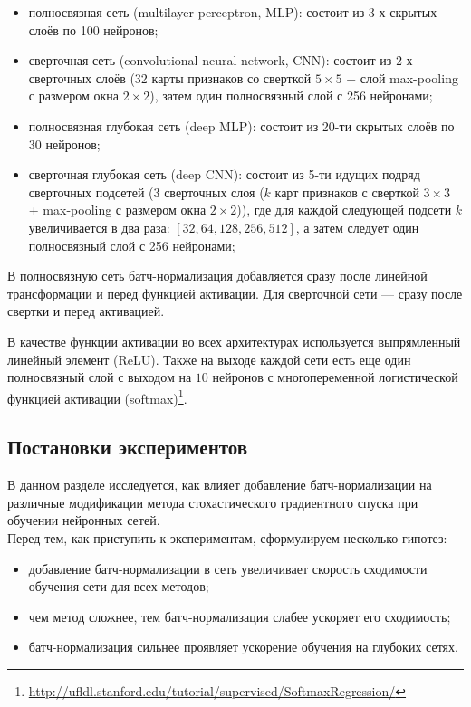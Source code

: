 \documentclass[12pt]{article}
\begin{document}
\begin{itemize}
\item полносвязная сеть (multilayer perceptron, MLP): состоит из 3-х скрытых слоёв по 100 нейронов;
\item сверточная сеть (convolutional neural network, CNN): состоит из 2-х сверточных слоёв (32 карты признаков со сверткой $5 \times 5$ + слой max-pooling с размером окна $2 \times 2$), затем один полносвязный слой с 256 нейронами;
\item полносвязная глубокая сеть (deep MLP): состоит из 20-ти скрытых слоёв по 30 нейронов;
\item сверточная глубокая сеть (deep CNN): состоит из 5-ти идущих подряд сверточных подсетей (3 сверточных слоя ($k$ карт признаков с сверткой $3 \times 3$ + max-pooling с размером окна $2 \times 2$)), где для каждой следующей подсети $k$ увеличивается в два раза: $[32, 64, 128, 256, 512]$, а затем следует один полносвязный слой с 256 нейронами;
\end{itemize}

В полносвязную сеть батч-нормализация добавляется сразу после линейной трансформации и перед функцией активации. Для сверточной сети --- сразу после свертки и перед активацией.

В качестве функции активации во всех архитектурах используется выпрямленный линейный элемент (ReLU). Также на выходе каждой сети есть еще один полносвязный слой с выходом на $10$ нейронов с многопеременной логистической функцией активации (softmax)\footnote{\url{http://ufldl.stanford.edu/tutorial/supervised/SoftmaxRegression/}}.


\subsection{Постановки экспериментов}

В данном разделе исследуется, как влияет добавление батч-нормализации на различные модификации метода стохастического градиентного спуска при обучении нейронных сетей.\\

Перед тем, как приступить к экспериментам, сформулируем несколько гипотез:
\begin{itemize}
\item добавление батч-нормализации в сеть увеличивает скорость сходимости обучения сети для всех методов;
\item чем метод сложнее, тем батч-нормализация слабее ускоряет его сходимость;
\item батч-нормализация сильнее проявляет ускорение обучения на глубоких сетях.
\end{itemize}
\end{document}
